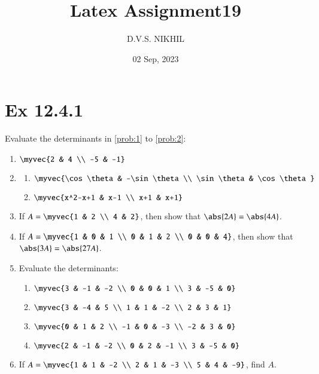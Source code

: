 \documentclass{article}
\theoremstyle{remark}
\begin{document}
\title{Latex Assignment19}
\author{D.V.S. NIKHIL}
\date{02 Sep, 2023}
\maketitle
\section*{Ex 12.4.1}
Evaluate the determinants in \ref{prob:1} to \ref{prob:2}:
\begin{enumerate}
\item $\myvec
{2 & 4 \\ -5 & -1}$ \label{prob:1}
\item  \label{prob:2}
\begin{enumerate}[label=(\roman*)]
\item $\myvec
{\cos \theta  &  -\sin \theta \\ \sin \theta & \cos \theta}$
\item $\myvec
{x^2-x+1 & x-1 \\ x+1 & x+1}$ 
\end{enumerate}
\item If $A=\myvec
{1 & 2 \\ 4 & 2}$, then show that $\abs{2A}=\abs{4A}$.
\item If $A=\myvec
{1 & 0 & 1 \\ 0 & 1 & 2 \\ 0 & 0 & 4}$, then show that $\abs{3A}=\abs{27A}$.
\item Evaluate the determinants:
\begin{enumerate}[label=(\roman*)]
\item $\myvec
{3 & -1 & -2 \\ 0 & 0 & 1 \\ 3 & -5 & 0}$
\item $\myvec
{3 & -4 & 5 \\ 1 & 1 & -2 \\ 2 & 3 & 1}$
\item $\myvec
{0 & 1 & 2 \\ -1 & 0 & -3 \\ -2 & 3 & 0}$
\item $\myvec
{2 & -1 & -2 \\ 0 & 2 & -1 \\ 3 & -5 & 0}$
\end{enumerate}
\item If $A=\myvec
{1 & 1 & -2 \\ 2 & 1 & -3 \\ 5 & 4 & -9}$, find $A$.

\end{enumerate}
\end{document}
